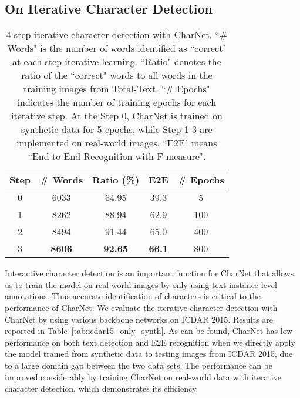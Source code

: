 \documentclass[10pt,twocolumn,letterpaper]{article}
\begin{document}
\subsection{On Iterative Character Detection}
\begin{table}[!t]
	\centering
\begin{tabular}{c|c|c|c|c}
	    \hline
		Step & \# Words & Ratio (\%) & E2E & \# Epochs\\
		\hline
		0 & 6033 & 64.95 & 39.3 & 5 \\
		1 & 8262 & 88.94 & 62.9 & 100\\
        2 & 8494 & 91.44 & 65.0 & 400\\
        3 & \textbf{8606} & \textbf{92.65} & \textbf{66.1} & 800\\
        \hline
	\end{tabular}
	\vspace{-2mm}
	\caption{4-step iterative character detection with CharNet. ``\# Words" is the number of words identified as ``correct" at each step iterative learning. ``Ratio" denotes the ratio of the ``correct" words to all words in the training images from Total-Text. ``\# Epochs" indicates the number of training epochs for each iterative step. At the Step 0, CharNet is trained on synthetic data for 5 epochs, while Step 1-3 are implemented on real-world images.  ``E2E" means ``End-to-End Recognition with F-measure".}
	\label{tab:iterative_annotation_generation}
\end{table}

Interactive character detection is an important function for CharNet that allows us to train the model on real-world images by only using text instance-level annotations. Thus accurate identification of characters is critical to the performance of CharNet. We evaluate the iterative character detection with CharNet by using various backbone networks on ICDAR 2015. Results are reported in Table~\ref{tab:icdar15_only_synth}.
As can be found, CharNet has low performance on both text detection and E2E recognition when we directly apply the model trained from synthetic data to testing images from ICDAR 2015, due to a large domain gap between the two data sets.
The performance can be improved considerably by training CharNet on real-world data with iterative character detection, which demonstrates its efficiency.
\end{document}

